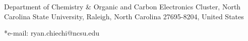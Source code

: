 \begin{affiliations}
 	\item Department of Chemistry \& Organic and Carbon Electronics Cluster, North Carolina State University, Raleigh, North
Carolina 27695-8204, United States
	\item[] *e-mail: ryan.chiechi@ncsu.edu
\end{affiliations}

